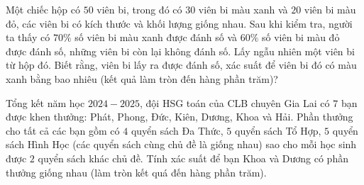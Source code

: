 \begin{bt}%
	Một chiếc hộp có $ 50$ viên bi, trong đó có $30$ viên bi màu xanh và $20$ viên bi màu đỏ, các viên bi có kích  thước và khối lượng giống nhau.
	Sau khi kiểm tra, người ta thấy có $70\%$ số viên bi màu xanh được đánh số và $60\%$ số viên bi màu đỏ được đánh số, những viên bi còn lại không đánh số. Lấy ngẫu nhiên một viên bi từ hộp đó. Biết rằng, viên bi lấy ra được đánh số, xác suất để viên bi đó có màu xanh bằng bao  nhiêu (kết quả làm tròn đến hàng phần trăm)? 
\end{bt}

\begin{bt}%
	Tổng kết năm học $2024-2025$, đội HSG toán của CLB chuyên Gia Lai có $7$ bạn được khen thưởng: Phát, Phong, Đức, Kiên, Dương, Khoa và Hải. Phần thưởng cho tất cả các bạn gồm có $4$ quyển sách Đa Thức, $5$ quyển sách Tổ Hợp, $5$ quyển sách Hình Học (các quyển sách cùng chủ đề là giống nhau) sao cho mỗi học sinh được $2$ quyển sách khác chủ đề. Tính xác suất để bạn Khoa và Dương có phần thưởng giống nhau (làm tròn kết quá đến hàng phần  trăm). 
\end{bt}

